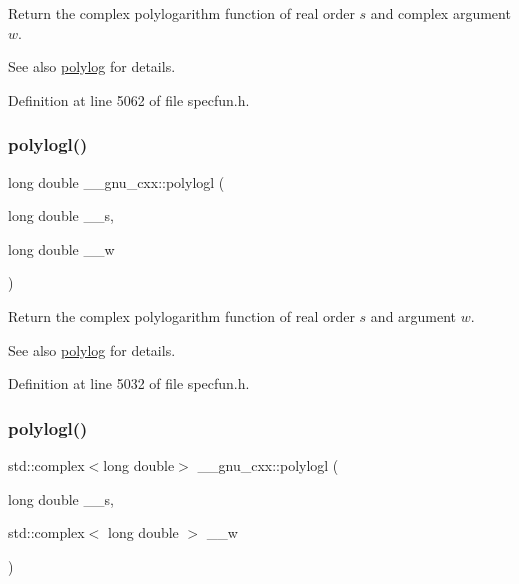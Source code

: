 Return the complex polylogarithm function of real order $ s $ and complex argument $ w $.

\begin{DoxySeeAlso}{See also}
\hyperlink{group__gnu__math__spec__func_gabcc5480ad739561c2debd6a8a352084f}{polylog} for details. 
\end{DoxySeeAlso}


Definition at line 5062 of file specfun.\+h.

\mbox{\label{group__gnu__math__spec__func_ga3aa007b4b4e345c30be015ab145d5598}} 
\subsubsection{\texorpdfstring{polylogl()}{polylogl()}\hspace{0.1cm}{\footnotesize\ttfamily [1/2]}}
{\footnotesize\ttfamily long double \+\_\+\+\_\+gnu\+\_\+cxx\+::polylogl (\begin{DoxyParamCaption}\item[{long double}]{\+\_\+\+\_\+s,  }\item[{long double}]{\+\_\+\+\_\+w }\end{DoxyParamCaption})\hspace{0.3cm}{\ttfamily [inline]}}

Return the complex polylogarithm function of real order $ s $ and argument $ w $.

\begin{DoxySeeAlso}{See also}
\hyperlink{group__gnu__math__spec__func_gabcc5480ad739561c2debd6a8a352084f}{polylog} for details. 
\end{DoxySeeAlso}


Definition at line 5032 of file specfun.\+h.

\mbox{\label{group__gnu__math__spec__func_ga9eb79e506eda210610bc59c1912b4d0f}} 
\subsubsection{\texorpdfstring{polylogl()}{polylogl()}\hspace{0.1cm}{\footnotesize\ttfamily [2/2]}}
{\footnotesize\ttfamily std\+::complex$<$long double$>$ \+\_\+\+\_\+gnu\+\_\+cxx\+::polylogl (\begin{DoxyParamCaption}\item[{long double}]{\+\_\+\+\_\+s,  }\item[{std\+::complex$<$ long double $>$}]{\+\_\+\+\_\+w }\end{DoxyParamCaption})\hspace{0.3cm}{\ttfamily [inline]}}

